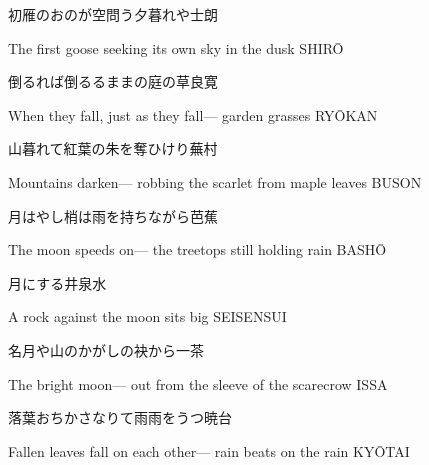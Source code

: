 \begin{haiku}
    {\FH 初雁のおのが空問う夕暮れや}\hfill{\FH 士朗}

    \vin{} The first goose
    \vin{} \vin{} seeking its own sky
    \vin{} \vin{} \vin{} in the dusk \hspace{\fill} SHIR\={O}
\end{haiku}

\begin{haiku}
    {\FH 倒るれば倒るるままの庭の草}\hfill{\FH 良寛}

    \vin{} When they fall,
    \vin{} \vin{} just as they fall---
    \vin{} \vin{} \vin{} garden grasses \hspace{\fill} RY\={O}KAN
\end{haiku}

\begin{haiku}
    {\FH 山暮れて紅葉の朱を奪ひけり}\hfill{\FH 蕪村}

    \vin{} Mountains darken---
    \vin{} \vin{} robbing the scarlet
    \vin{} \vin{} \vin{} from maple leaves \hspace{\fill} BUSON
\end{haiku}

\begin{haiku}
    {\FH 月はやし梢は雨を持ちながら}\hfill{\FH 芭蕉}

    \vin{} The moon speeds on---
    \vin{} \vin{} the treetops
    \vin{} \vin{} \vin{} still holding rain \hspace{\fill} BASH\={O}
\end{haiku}

\begin{haiku}
    {\FH {}月にする}\hfill{\FH 井泉水}

    \vin{} A rock
    \vin{} \vin{} against the moon
    \vin{} \vin{} \vin{} sits big \hspace{\fill} SEISENSUI
\end{haiku}

\begin{haiku}
    {\FH 名月や山のかがしの袂から}\hfill{\FH 一茶}

    \vin{} The bright moon---
    \vin{} \vin{} out from the sleeve
    \vin{} \vin{} \vin{} of the scarecrow \hspace{\fill} ISSA
\end{haiku}

\begin{haiku}
    {\FH 落葉おちかさなりて雨雨をうつ}\hfill{\FH 暁台}

    \vin{} Fallen leaves
    \vin{} \vin{} fall on each other---
    \vin{} \vin{} \vin{} rain beats on the rain \hspace{\fill} KY\={O}TAI
\end{haiku}

